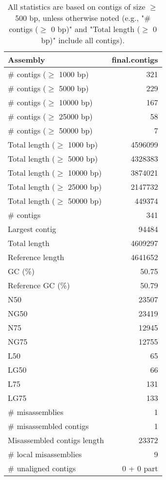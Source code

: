 \documentclass[12pt,a4paper]{article}
\begin{document}
\begin{table}[ht]
\begin{center}
\caption{All statistics are based on contigs of size $\geq$ 500 bp, unless otherwise noted (e.g., "\# contigs ($\geq$ 0 bp)" and "Total length ($\geq$ 0 bp)" include all contigs).}
\begin{tabular}{|l*{1}{|r}|}
\hline
Assembly & final.contigs \\ \hline
\# contigs ($\geq$ 1000 bp) & 321 \\ \hline
\# contigs ($\geq$ 5000 bp) & 229 \\ \hline
\# contigs ($\geq$ 10000 bp) & 167 \\ \hline
\# contigs ($\geq$ 25000 bp) & 58 \\ \hline
\# contigs ($\geq$ 50000 bp) & 7 \\ \hline
Total length ($\geq$ 1000 bp) & 4596099 \\ \hline
Total length ($\geq$ 5000 bp) & 4328383 \\ \hline
Total length ($\geq$ 10000 bp) & 3874021 \\ \hline
Total length ($\geq$ 25000 bp) & 2147732 \\ \hline
Total length ($\geq$ 50000 bp) & 449374 \\ \hline
\# contigs & 341 \\ \hline
Largest contig & 94484 \\ \hline
Total length & 4609297 \\ \hline
Reference length & 4641652 \\ \hline
GC (\%) & 50.75 \\ \hline
Reference GC (\%) & 50.79 \\ \hline
N50 & 23507 \\ \hline
NG50 & 23419 \\ \hline
N75 & 12945 \\ \hline
NG75 & 12755 \\ \hline
L50 & 65 \\ \hline
LG50 & 66 \\ \hline
L75 & 131 \\ \hline
LG75 & 133 \\ \hline
\# misassemblies & 1 \\ \hline
\# misassembled contigs & 1 \\ \hline
Misassembled contigs length & 23372 \\ \hline
\# local misassemblies & 9 \\ \hline
\# unaligned contigs & 0 + 0 part \\ \hline

\end{tabular}
\end{center}
\end{table}
\end{document}
